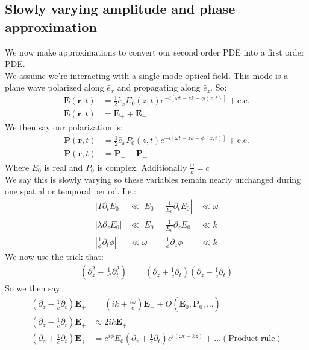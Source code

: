 \subsection{Slowly varying amplitude and phase approximation}
We now make approximations to convert our second order PDE into a first order PDE.\\
We assume we're interacting with a single mode optical field. This mode is a plane wave polarized along $\hat{e}_x$ and propagating along $\hat{e}_z$. So:
\begin{align*}
	\bm{E}(\bm{r},t) &= \frac{1}{2}\hat{e}_xE_0(z,t)e^{-i[\omega t-zk-\phi(z,t)]} + \text{c.c.} \\
	\bm{E}(\bm{r},t) &= \bm{E}_+ + \bm{E}_-
\end{align*}
We then say our polarization is:
\begin{align*}
	\bm{P}(\bm{r},t) &= \frac{1}{2}\hat{e}_xP_0(z,t)e^{-i[\omega t-zk-\phi(z,t)]} + \text{c.c.} \\
	\bm{P}(\bm{r},t) &= \bm{P}_+ + \bm{P}_-
\end{align*}
Where $E_0$ is real and $P_0$ is complex. Additionally $\frac{\omega}{k} = c$ \\
We say this is slowly varying so these variables remain nearly unchanged during one spatial or temporal period. I.e.:
\begin{align*}
	|T\partial_t E_0 | &\ll |E_0| &
	|\frac{1}{E_0}\partial_t E_0 | &\ll \omega  \\
	|\lambda \partial_z E_0| &\ll |E_0| &
	|\frac{1}{E_0} \partial_z E_0| &\ll k \\
	|\frac{1}{\phi}\partial_t\phi | &\ll \omega &
	|\frac{1}{\phi}\partial_z\phi | &\ll k
\end{align*}
We now use the trick that:
\begin{align*}
	\left(\partial_z^2 - \frac{1}{c^2}\partial_t^2\right) &= \left(\partial_z + \frac{1}{c}\partial_t\right)\left(\partial_z - \frac{1}{c}\partial_t\right)
\end{align*}
So we then say:
\begin{align*}
	\left(\partial_z - \frac{1}{c}\partial_t\right)\bm{E}_+ &= \left(ik + \frac{i\omega}{c}\right)\bm{E}_+ + O(\dot{\bm{E}_0}, \dot{\bm{P}_0},\ldots) \\
	\left(\partial_z - \frac{1}{c}\partial_t\right)\bm{E}_+ &\approx 2ik\bm{E}_+ \\
	\left(\partial_z + \frac{1}{c}\partial_t\right)\bm{E}_+ &= e^{i\phi}E_0 \left(\partial_z + \frac{1}{c}\partial_t\right)e^{i(\omega t - kz)} + \ldots (\text{Product rule})
\end{align*}
